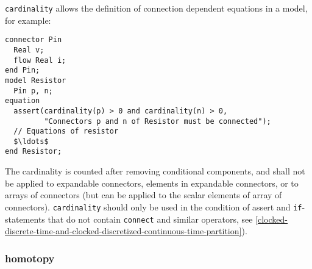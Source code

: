 \begin{nonnormative}
\lstinline!cardinality! allows the definition of connection dependent equations in a model, for example:
\begin{lstlisting}[language=modelica]
connector Pin
  Real v;
  flow Real i;
end Pin;
model Resistor
  Pin p, n;
equation
  assert(cardinality(p) > 0 and cardinality(n) > 0,
         "Connectors p and n of Resistor must be connected");
  // Equations of resistor
  $\ldots$
end Resistor;
\end{lstlisting}
\end{nonnormative}

The cardinality is counted after removing conditional components, and shall not be applied to expandable connectors, elements in expandable connectors, or to arrays of connectors (but can be applied to the scalar elements of array of connectors).
\lstinline!cardinality! should only be used in the condition of assert and \lstinline!if!-statements that do not contain \lstinline!connect! and similar operators, see \cref{clocked-discrete-time-and-clocked-discretized-continuous-time-partition}).

\subsubsection{homotopy}\label{homotopy}

